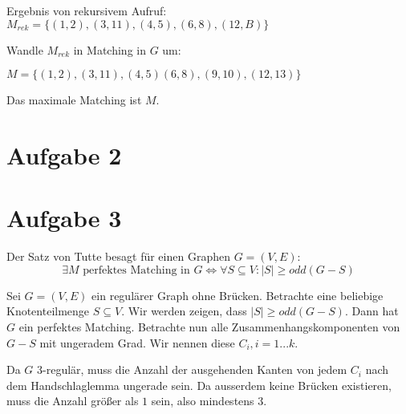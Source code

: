 \documentclass[a4paper]{article}
\begin{document}
\parbox[b]{0.45\textwidth}{
Ergebnis von rekursivem Aufruf: \\
$M_{rek} = \{ (1,2), (3,11), (4,5), (6,8), (12, B)\}$

Wandle $M_{rek}$ in Matching in $G$ um:

$M = \{ (1, 2), (3, 11), (4,5) (6, 8), (9, 10), (12, 13) \}$

Das maximale Matching ist $M$. \\
}


\section{Aufgabe 2}

\section{Aufgabe 3}
Der Satz von Tutte besagt für einen Graphen $G = (V, E)$:
\[
	\exists M \text{ perfektes Matching in } G \Leftrightarrow
	\forall S \subseteq V: |S| \geq odd(G - S)
\]

Sei $G = (V, E)$ ein regulärer Graph ohne Brücken.
Betrachte eine beliebige Knotenteilmenge $S \subseteq V$.
Wir werden zeigen, dass $|S| \geq odd(G - S)$. Dann hat $G$ ein perfektes
Matching.
Betrachte nun alle Zusammenhangskomponenten von $G - S$ mit ungeradem Grad.
Wir nennen diese $C_i, i = 1 ... k$.

Da $G$ 3-regulär, muss die Anzahl der ausgehenden Kanten von jedem $C_i$
nach dem Handschlaglemma ungerade sein. Da ausserdem keine Brücken
existieren, muss die Anzahl größer als $1$ sein, also mindestens $3$.
\end{document}
